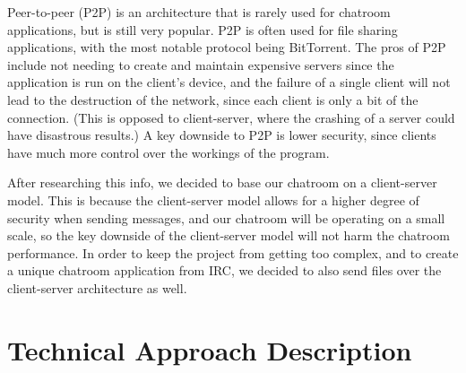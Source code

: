 \documentclass{article}
\begin{document}
Peer-to-peer (P2P) is an architecture that is rarely used for chatroom applications, but is still very popular. P2P is often used for file sharing applications, with the most notable protocol being BitTorrent. The pros of P2P include not needing to create and maintain expensive servers since the application is run on the client's device, and the failure of a single client will not lead to the destruction of the network, since each client is only a bit of the connection. (This is opposed to client-server, where the crashing of a server could have disastrous results.) A key downside to P2P is lower security, since clients have much more control over the workings of the program.

After researching this info, we decided to base our chatroom on a client-server model. This is because the client-server model allows for a higher degree of security when sending messages, and our chatroom will be operating on a small scale, so the key downside of the client-server model will not harm the chatroom performance. In order to keep the project from getting too complex, and to create a unique chatroom application from IRC, we decided to also send files over the client-server architecture as well.

\section{Technical Approach Description}






\end{document}
